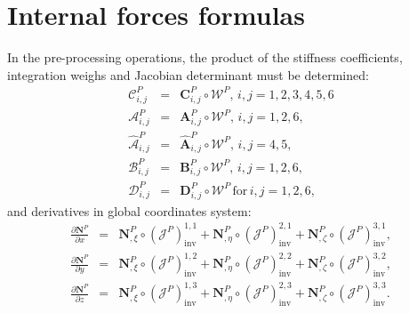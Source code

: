 

\chapter{Internal forces formulas}
\label{app:fu}

In the pre-processing operations, the product of the stiffness coefficients, integration weighs and Jacobian determinant must be determined:
\begin{eqnarray}
	\mathcal{C}^P_{i,j} &=& \textbf{C}^P_{i,j}\circ\mathcal{W}^P,\,i,j=1,2,3,4,5,6\\
	\mathcal{A}^P_{i,j} &=& \textbf{A}^P_{i,j}\circ\mathcal{W}^P,\,i,j=1,2,6,\\
	\hat{\mathcal{A}}^P_{i,j} &=& \hat{\textbf{A}}^P_{i,j}\circ\mathcal{W}^P,\,i,j=4,5,\\
	\mathcal{B}^P_{i,j} &=& \textbf{B}^P_{i,j}\circ\mathcal{W}^P,\,i,j=1,2,6,\\
	\mathcal{D}^P_{i,j} &=& \textbf{D}^P_{i,j}\circ\mathcal{W}^P\, \mathrm{for}\, i,j=1,2,6,
\end{eqnarray}
and derivatives in global coordinates system:
\begin{eqnarray}
\frac{\partial \textbf{N}^P}{\partial x} &=& \textbf{N}^P_{,\xi}\circ\left(\mathcal{J}^P\right)^{1,1}_{\mathrm{inv}} + \textbf{N}^P_{,\eta}\circ\left(\mathcal{J}^P\right)^{2,1}_{\mathrm{inv}} + \textbf{N}^P_{,\zeta}\circ\left(\mathcal{J}^P\right)^{3,1}_{\mathrm{inv}},\\
\frac{\partial \textbf{N}^P}{\partial y} &=& \textbf{N}^P_{,\xi}\circ\left(\mathcal{J}^P\right)^{1,2}_{\mathrm{inv}} + \textbf{N}^P_{,\eta}\circ\left(\mathcal{J}^P\right)^{2,2}_{\mathrm{inv}} + \textbf{N}^P_{,\zeta}\circ\left(\mathcal{J}^P\right)^{3,2}_{\mathrm{inv}},\\
\frac{\partial \textbf{N}^P}{\partial z} &=& \textbf{N}^P_{,\xi}\circ\left(\mathcal{J}^P\right)^{1,3}_{\mathrm{inv}} + \textbf{N}^P_{,\eta}\circ\left(\mathcal{J}^P\right)^{2,3}_{\mathrm{inv}} + \textbf{N}^P_{,\zeta}\circ\left(\mathcal{J}^P\right)^{3,3}_{\mathrm{inv}}.
\end{eqnarray}

